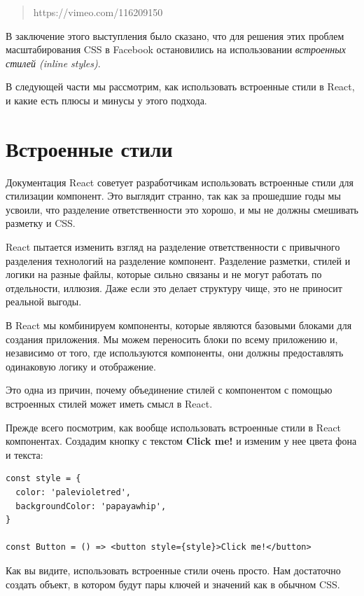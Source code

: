 \begin{quotation}
https://vimeo.com/116209150	
\end{quotation}

В заключение этого выступления было сказано, что для решения этих проблем масштабирования CSS в Facebook остановились на использовании \textit{встроенных стилей (inline styles)}.

В следующей части мы рассмотрим, как использовать встроенные стили в React, и какие есть плюсы и минусы у этого подхода.

\section{Встроенные стили}

Документация React советует разработчикам использовать встроенные стили для стилизации компонент. Это выглядит странно, так как за прошедшие годы мы усвоили, что разделение ответственности это хорошо, и мы не должны смешивать разметку и CSS.

React пытается изменить взгляд на разделение ответственности с привычного разделения технологий на разделение компонент. Разделение разметки, стилей и логики на разные файлы, которые сильно связаны и не могут работать по отдельности, иллюзия. Даже если это делает структуру чище, это не приносит реальной выгоды.

В React мы комбинируем компоненты, которые являются базовыми блоками для создания приложения. Мы можем переносить блоки по всему приложению и, независимо от того, где используются компоненты, они должны предоставлять одинаковую логику и отображение.

Это одна из причин, почему объединение стилей с компонентом с помощью встроенных стилей может иметь смысл в React.

Прежде всего посмотрим, как вообще использовать встроенные стили в React компонентах. Создадим кнопку с текстом \textbf{Click me!} и изменим у нее цвета фона и текста:

\begin{lstlisting}
const style = {
  color: 'palevioletred',
  backgroundColor: 'papayawhip',
}

const Button = () => <button style={style}>Click me!</button>
\end{lstlisting}

Как вы видите, использовать встроенные стили очень просто. Нам достаточно создать объект, в котором будут пары ключей и значений как в обычном CSS.

